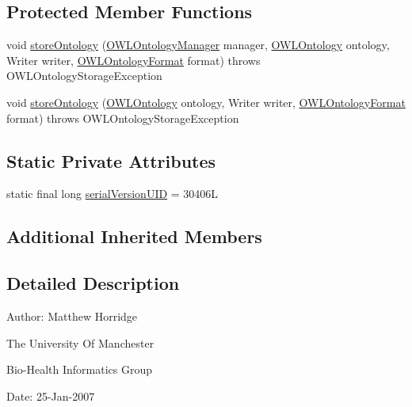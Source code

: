 \subsection*{Protected Member Functions}
\begin{DoxyCompactItemize}
\item 
void \hyperlink{classorg_1_1coode_1_1owlapi_1_1functionalrenderer_1_1_o_w_l_functional_syntax_ontology_storer_ab098732b0040156fc34144826970e30d}{store\-Ontology} (\hyperlink{interfaceorg_1_1semanticweb_1_1owlapi_1_1model_1_1_o_w_l_ontology_manager}{O\-W\-L\-Ontology\-Manager} manager, \hyperlink{interfaceorg_1_1semanticweb_1_1owlapi_1_1model_1_1_o_w_l_ontology}{O\-W\-L\-Ontology} ontology, Writer writer, \hyperlink{classorg_1_1semanticweb_1_1owlapi_1_1model_1_1_o_w_l_ontology_format}{O\-W\-L\-Ontology\-Format} format)  throws O\-W\-L\-Ontology\-Storage\-Exception 
\item 
void \hyperlink{classorg_1_1coode_1_1owlapi_1_1functionalrenderer_1_1_o_w_l_functional_syntax_ontology_storer_a97518ef93da8ee9b3cfded762d257104}{store\-Ontology} (\hyperlink{interfaceorg_1_1semanticweb_1_1owlapi_1_1model_1_1_o_w_l_ontology}{O\-W\-L\-Ontology} ontology, Writer writer, \hyperlink{classorg_1_1semanticweb_1_1owlapi_1_1model_1_1_o_w_l_ontology_format}{O\-W\-L\-Ontology\-Format} format)  throws O\-W\-L\-Ontology\-Storage\-Exception 
\end{DoxyCompactItemize}
\subsection*{Static Private Attributes}
\begin{DoxyCompactItemize}
\item 
static final long \hyperlink{classorg_1_1coode_1_1owlapi_1_1functionalrenderer_1_1_o_w_l_functional_syntax_ontology_storer_a8645b6009eb520ca88cb27792b46ec33}{serial\-Version\-U\-I\-D} = 30406\-L
\end{DoxyCompactItemize}
\subsection*{Additional Inherited Members}


\subsection{Detailed Description}
Author\-: Matthew Horridge\par
 The University Of Manchester\par
 Bio-\/\-Health Informatics Group\par
 Date\-: 25-\/\-Jan-\/2007\par
 \par
 

